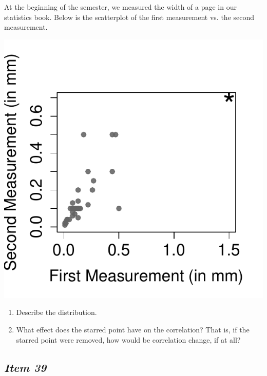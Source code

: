 At the beginning of the semester, we measured the width of a page in our statistics book. Below is the scatterplot of the first measurement vs. the second measurement. 





\begin{marginfigure}


\includegraphics{includes/Item32_R.pdf}


\end{marginfigure}





\begin{enumerate}[leftmargin=1cm, itemsep=.2em]


\item Describe the distribution.


\item What effect does the starred point have on the correlation? That is, if the starred point were removed, how would be correlation change, if at all?


\end{enumerate}





\subsection{\textbf{\textit{Item 39}}}


